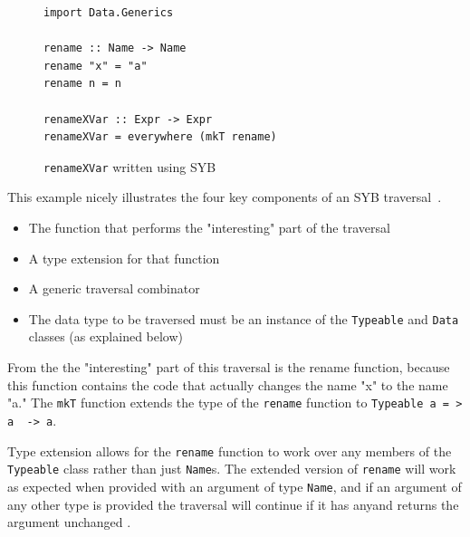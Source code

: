 	\begin{figure}[t]
	\DIFdelbeginFL %


\DIFdelendFL \DIFaddbeginFL \begin{lstlisting}
import Data.Generics	

rename :: Name -> Name
rename "x" = "a"
rename n = n

renameXVar :: Expr -> Expr
renameXVar = everywhere (mkT rename)
\end{lstlisting}
\DIFaddendFL \caption{\texttt{renameXVar} written using SYB}
\label{renameSYB}
\end{figure} 

This example nicely illustrates the four key components of an SYB traversal~\citep{syb}.

	\begin{itemize}
		\item The function that performs the "interesting" part of the traversal
		\item A type extension for that function
		\item A generic traversal combinator
		\item The data type to be traversed must be an instance of the \texttt{Typeable} and \texttt{Data} classes (as explained below)
	\end{itemize}

	From the \DIFdelbegin {}\DIFdelend \DIFaddbegin {}\DIFaddend the "interesting" part of this traversal is the rename function, because this function contains the code that actually changes the name "x" to the name "a." The \texttt{mkT} function extends the type of the \texttt{rename} function to \texttt{Typeable~a = > a~ -> a}. 

	Type extension allows for the \texttt{rename} function to work over any members of the \texttt{Typeable} class rather than just \texttt{Name}s. The extended version of \texttt{rename} will work as expected when provided with an argument of type \texttt{Name}, and if an argument of any other type is provided the traversal will continue \DIFdelbegin {}\DIFdelend \DIFaddbegin {}\DIFaddend if it has any\DIFaddbegin \DIFadd{, }\DIFaddend and returns the argument unchanged \DIFdelbegin {}\DIFdelend \DIFaddbegin {}\DIFaddend .

